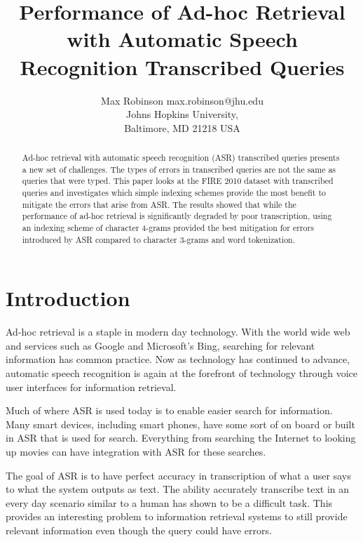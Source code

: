 \documentclass[jair, twoside,11pt,theapa]{article}
\begin{document}
\title{Performance of Ad-hoc Retrieval with Automatic Speech Recognition Transcribed Queries}

\author{\name Max Robinson \email max.robinson@jhu.edu \\
       \addr Johns Hopkins University,\\
       Baltimore, MD 21218 USA
}

\maketitle

\begin{abstract}
\label{Abstract}
Ad-hoc retrieval with automatic speech recognition (ASR) transcribed queries presents a new set of challenges. The types of errors in transcribed queries are not the same as queries that were typed. This paper looks at the FIRE 2010 dataset with transcribed queries and investigates which simple indexing schemes provide the most benefit to mitigate the errors that arise from ASR. The results showed that while the performance of ad-hoc retrieval is significantly degraded by poor transcription, using an indexing scheme of character 4-grams provided the best mitigation for errors introduced by ASR compared to character 3-grams and word tokenization. 

\end{abstract}


\section{Introduction}
\label{Introduction}
Ad-hoc retrieval is a staple in modern day technology. With the world wide web and services such as Google and Microsoft's Bing, searching for relevant information has common practice. Now as technology has continued to advance, automatic speech recognition is again at the forefront of technology through voice user interfaces for information retrieval. 

Much of where ASR is used today is to enable easier search for information. Many smart devices, including smart phones, have some sort of on board or built in ASR that is used for search. Everything from searching the Internet to looking up movies can have integration with ASR for these searches.

The goal of ASR is to have perfect accuracy in transcription of what a user says to what the system outputs as text. The ability accurately transcribe text in an every day scenario similar to a human has shown to be a difficult task. This provides an interesting problem to information retrieval systems to still provide relevant information even though the query could have errors. 
\end{document}
